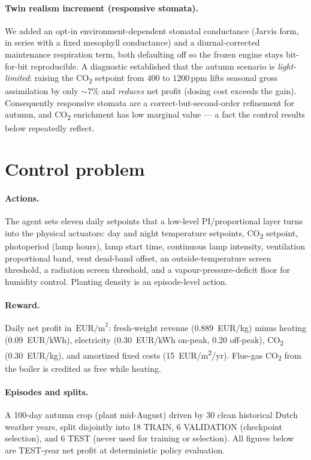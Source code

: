 \documentclass[11pt]{article}
\newcommand{\eurpm}{\,\text{EUR/m}^2}
\begin{document}
\paragraph{Twin realism increment (responsive stomata).}
We added an opt-in environment-dependent stomatal conductance (Jarvis form, in
series with a fixed mesophyll conductance) and a diurnal-corrected maintenance
respiration term, both defaulting off so the frozen engine stays bit-for-bit
reproducible. A diagnostic established that the autumn scenario is
\emph{light-limited}: raising the CO\textsubscript{2} setpoint from $400$ to $1200$\,ppm lifts
seasonal gross assimilation by only $\sim 7\%$ and \emph{reduces} net profit
(dosing cost exceeds the gain). Consequently responsive stomata are a
correct-but-second-order refinement for autumn, and CO\textsubscript{2} enrichment has low
marginal value --- a fact the control results below repeatedly reflect.

\section{Control problem}
\paragraph{Actions.} The agent sets eleven daily setpoints that a low-level
PI/proportional layer turns into the physical actuators: day and night temperature
setpoints, CO\textsubscript{2} setpoint, photoperiod (lamp hours), lamp start time, continuous
lamp intensity, ventilation proportional band, vent dead-band offset, an
outside-temperature screen threshold, a radiation screen threshold, and a
vapour-pressure-deficit floor for humidity control. Planting density is an
episode-level action.

\paragraph{Reward.} Daily net profit in $\eurpm$: fresh-weight revenue
(\SI{0.889}{EUR/kg}) minus heating (\SI{0.09}{EUR/kWh}), electricity
(\SI{0.30}{EUR/kWh} on-peak, \SI{0.20}{} off-peak), CO\textsubscript{2} (\SI{0.30}{EUR/kg}),
and amortized fixed costs (\SI{15}{EUR/m^2/yr}). Flue-gas CO\textsubscript{2} from the boiler
is credited as free while heating.

\paragraph{Episodes and splits.} A 100-day autumn crop (plant mid-August) driven by
30 clean historical Dutch weather years, split disjointly into 18 TRAIN, 6
VALIDATION (checkpoint selection), and 6 TEST (never used for training or
selection). All figures below are TEST-year net profit at deterministic policy
evaluation.
\end{document}
